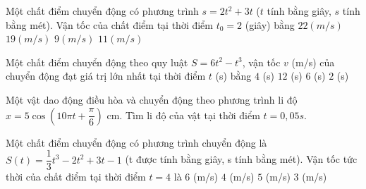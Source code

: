 \begin{ex}%
	Một chất điểm chuyển động có phương trình $s=2t^2+3t$ ($t$ tính bằng giây, $s$ tính bằng mét). Vận tốc của chất điểm tại  thời điểm $t_0=2$ (giây) bằng
	\choice 
		 {$22\left(m/s\right)$}
		{$19\left(m/s\right)$} 
		 {$9\left(m/s\right)$}
		{\True$11\left(m/s\right)$} 
\end{ex}

\begin{ex}%
	Một chất điểm chuyển động theo quy luật  $S=6t^{2}-t^{3}$, vận tốc $v$ (m/s) của chuyển động đạt giá trị lớn nhất tại thời điểm $t$ (s) bằng
	 \choice
		{$4$ (s)} 
		{$12$  (s)}
		 {$6$ (s)}
		 {\True $2$ (s)}
\end{ex}

\begin{ex}%
	Một vật  dao động điều hòa và chuyển động theo phương trình li độ $x=5\cos \left(10\pi t+\dfrac{\pi}{6} \right)$ cm. Tìm li độ của vật tại thời điểm $t=0{,}05s$.
\end{ex}

\begin{ex}%
	Một chất điểm chuyển động  có phương trình chuyển động là $S(t)=\dfrac{1}{3}t^{3}-2t^{2}+3t-1$ (t được tính bằng giây, s tính bằng mét). Vận tốc tức thời của chất điểm tại thời điểm $t=4$ là
	\choice 
		 {$6$ (m/s)}
		{$4$ (m/s)} 
		{$5$  (m/s)}
		{\True $3$ (m/s)} 
\end{ex}

